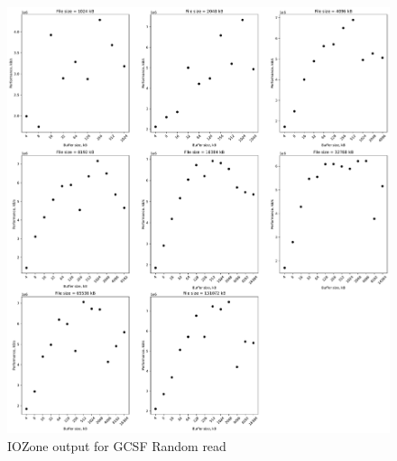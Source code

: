 \begin{figure}[!htb]
	\label{fig:bench_gcsf_rnd_read}
	\begin{center}
		\includegraphics[width=1.0\textwidth]{figures/benchmarking/gcsf/Random read.pdf}
	\end{center}
	\caption{IOZone output for GCSF Random read}
\end{figure}


